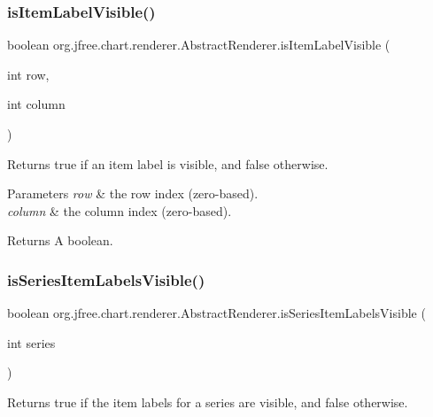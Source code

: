 \subsubsection{\texorpdfstring{is\+Item\+Label\+Visible()}{isItemLabelVisible()}}
{\footnotesize\ttfamily boolean org.\+jfree.\+chart.\+renderer.\+Abstract\+Renderer.\+is\+Item\+Label\+Visible (\begin{DoxyParamCaption}\item[{int}]{row,  }\item[{int}]{column }\end{DoxyParamCaption})}

Returns {\ttfamily true} if an item label is visible, and {\ttfamily false} otherwise.


\begin{DoxyParams}{Parameters}
{\em row} & the row index (zero-\/based). \\
\hline
{\em column} & the column index (zero-\/based).\\
\hline
\end{DoxyParams}
\begin{DoxyReturn}{Returns}
A boolean. 
\end{DoxyReturn}
\mbox{\label{classorg_1_1jfree_1_1chart_1_1renderer_1_1_abstract_renderer_a893ef1d89ebb97a85a44879826e7a02b}} 
\subsubsection{\texorpdfstring{is\+Series\+Item\+Labels\+Visible()}{isSeriesItemLabelsVisible()}}
{\footnotesize\ttfamily boolean org.\+jfree.\+chart.\+renderer.\+Abstract\+Renderer.\+is\+Series\+Item\+Labels\+Visible (\begin{DoxyParamCaption}\item[{int}]{series }\end{DoxyParamCaption})}

Returns {\ttfamily true} if the item labels for a series are visible, and {\ttfamily false} otherwise.


